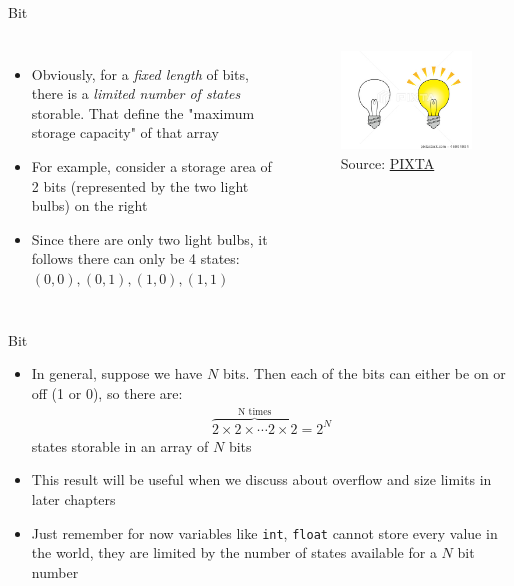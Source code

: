 \documentclass[10pt,xcolor={table,dvipsnames},t]{beamer}
\begin{document}
\begin{frame}{Bit}
  \begin{columns}
    \begin{itemize}
      \item Obviously, for a \textit{fixed length} of bits, there is a \textit{limited number of states} storable. That define the "maximum storage capacity" of that array 
      \item For example, consider a storage area of 2 bits (represented by the two light bulbs) on the right
      \item Since there are only two light bulbs, it follows there can only be 4 states: ${(0,0),(0,1),(1,0),(1,1)}$
    \end{itemize}
    \begin{figure}
      \includegraphics[width=\textwidth]{img/two-light-bulb.jpg}
      \caption*{Source: \href{https://www.pixtastock.com/illustration/46094084}{PIXTA}}
    \end{figure}
  \end{columns}
  
\end{frame}

\begin{frame}{Bit}
  \begin{itemize}
    \item In general, suppose we have $N$ bits. Then each of the bits can either be on or off (1 or 0), so there are:
    \begin{align*}
      \overbrace{2\times 2 \times \cdots 2 \times 2}^{\text{N times}} = 2^N
    \end{align*}
    states storable in an array of $N$ bits
    \item This result will be useful when we discuss about overflow and size limits in later chapters
    \item Just remember for now variables like \texttt{int}, \texttt{float} cannot store every value in the world, they are limited by the number of states available for a $N$ bit number
  \end{itemize}
\end{frame}
\end{document}
